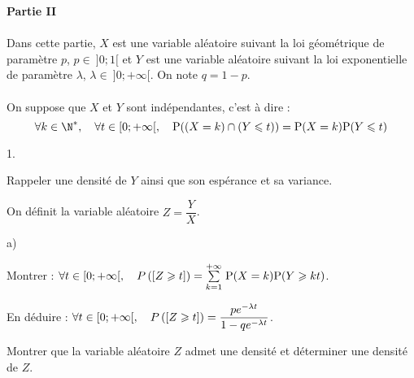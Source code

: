 \documentclass[11pt]{article}%
\begin{document}
{\bf Partie II}\\
\\
Dans cette partie, $X$ est une variable aléatoire suivant la loi
géométrique de paramètre $p$, $p\in \ ]0;1[$ et $Y$ est une variable
aléatoire suivant la loi exponentielle de paramètre $\lambda$,
$\lambda\in \ ]0; + \infty[$. On note $q = 1-p$.\\
\\
On suppose que $X$ et $Y$ sont indépendantes, c'est à dire : 
\[
\forall k\in \N^*, \quad \forall t\in [0; + \infty[, \quad \text{P}((X
= k)\cap(Y\leq t )) = \text{P}(X = k)\text{P}(Y\leq t)
\]
\begin{noliste}{1.}
 \setlength{\itemsep}{4mm}
\item Rappeler une densité de $Y$ ainsi que son espérance et sa
variance.
\item On définit la variable aléatoire $Z = \dfrac{Y}{X}$.
\begin{noliste}{a)}
 \setlength{\itemsep}{2mm}
\item Montrer : $\forall t\in [0; + \infty[, \quad P\left(\left[ {Z\geqslant
t} \right]\right) = {\textstyle\sum\limits_{k = 1}^{+ \infty}}\hspace{.1cm}\text{P}(X = k)\text{P}(Y\geqslant kt)$.
\item En déduire : $\forall t\in [0; + \infty[, \quad P\left(\left[ {Z\geqslant
t} \right]\right) = \dfrac{pe^{-\lambda t}}{1-qe^{-\lambda t}}$.
\item Montrer que la variable aléatoire $Z$ admet une densité et
déterminer une densité de $Z$.
\end{noliste}
\end{noliste}
\end{document}
